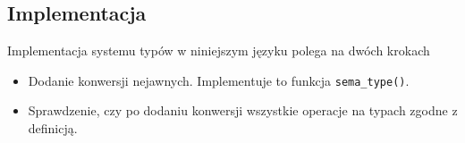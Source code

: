 	\subsection{Implementacja}
		
		Implementacja systemu typów w niniejszym języku polega na dwóch krokach
		
		\begin{itemize}
			\item Dodanie konwersji nejawnych. Implementuje to funkcja \texttt{sema\_type()}.
			\item Sprawdzenie, czy po dodaniu konwersji wszystkie operacje na typach zgodne z
			      definicją.
		\end{itemize}
